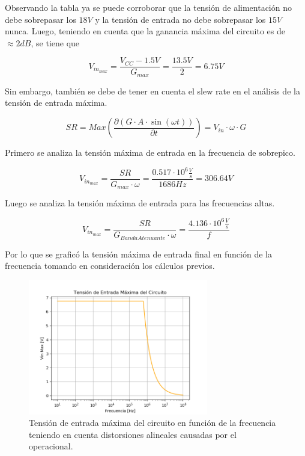 \documentclass[a4paper]{article}
\begin{document}
Observando la tabla ya se puede corroborar que la tensión de alimentación no debe sobrepasar los $18V$ y la tensión de entrada no debe sobrepasar los $15V$ nunca.
Luego, teniendo en cuenta que la ganancia máxima del circuito es de $\approx 2dB$, se tiene que

\begin{equation}
	V_{in_{max}} = \frac{V_{CC} - 1.5V}{G_{max}} = \frac{13.5V}{2} = 6.75V
\end{equation}

Sin embargo, también se debe de tener en cuenta el slew rate en el análisis de la tensión de entrada máxima.

\begin{equation}
	SR= Max\left( \frac{\partial (G\cdot A\cdot \sin (\omega t))}{\partial t}\right) = V_{in} \cdot \omega \cdot G  
\end{equation}

Primero se analiza la tensión máxima de entrada en la frecuencia de sobrepico.

\begin{equation}
	V_{in_{max}} = \frac{SR}{G_{max}\cdot \omega} = \frac{0.517\cdot 10^6\frac{V}{s}}{1686Hz} = 306.64V
\end{equation}

Luego se analiza la tensión máxima de entrada para las frecuencias altas.

\begin{equation}
	V_{in_{max}} = \frac{SR}{G_{Banda Atenuante}\cdot \omega} = \frac{4.136\cdot 10^6\frac{V}{s}}{f}
\end{equation}

Por lo que se graficó la tensión máxima de entrada final en función de la frecuencia tomando en consideración los cálculos previos.

\begin{figure} [H]
	\centering
	\includegraphics[width=0.7\textwidth]{Imagenes/vin_max.PNG}
	\caption{Tensión de entrada máxima del circuito en función de la frecuencia teniendo en cuenta distorsiones alineales causadas por el operacional.}
	\label{fig:vin_max}
\end{figure}
\end{document}
